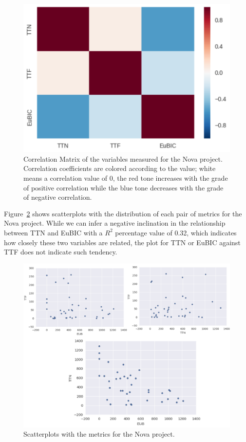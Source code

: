 \documentclass[10pt, conference]{IEEEtran}
\begin{document}
\begin{figure}[ht]
\centering
\includegraphics[width=\columnwidth]{correlationMatrix.png}
\caption{Correlation Matrix of the variables measured for the Nova project. Correlation coefficients are colored according to the value; white means a correlation value of 0, the red tone increases with the grade of positive correlation while the blue tone decreases with the grade of negative correlation.}
\label{fig:correlation}       %
\end{figure}

Figure~\ref{fig:graph} shows scatterplots with the distribution of each pair of metrics for the Nova project. While we can infer a negative inclination in the relationship between TTN and EuBIC with a $R^2$ percentage value of 0.32, which indicates how closely these two variables are related, the plot for TTN or EuBIC against TTF does not indicate such tendency. 

\begin{figure}[ht]
\centering
\includegraphics[width=\columnwidth]{DistributionNova_b.png}
\caption{ Scatterplots with the metrics for the Nova project.}
\label{fig:graph}       %
\end{figure}
\end{document}
